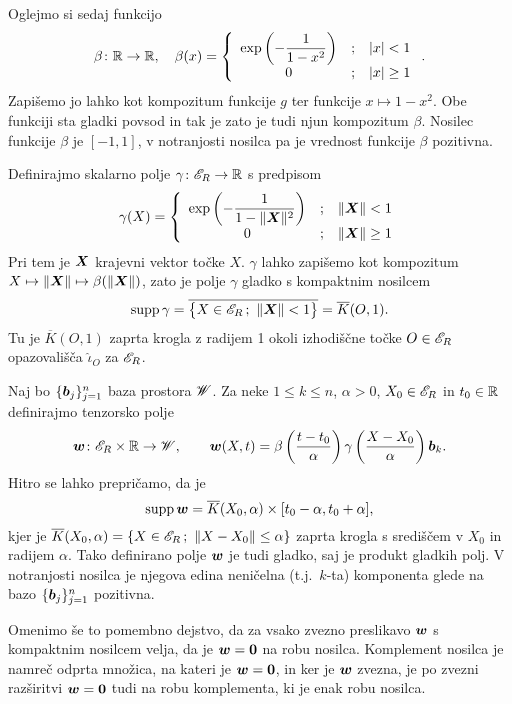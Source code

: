 Oglejmo si sedaj funkcijo
\[
	\beta\colon\mathbb R\to\mathbb R,\quad \beta(x)=\left\{\begin{array}{ccl}
	\exp\left(-\dfrac{1}{1-x^2}\right)&;&|x|<1 \\ 0&;&|x|\geq 1 \end{array}\right. .
\]
Zapišemo jo lahko kot kompozitum funkcije $g$ ter funkcije $x\mapsto 1-x^2$. Obe funkciji sta
gladki povsod in tak je zato je tudi njun kompozitum $\beta$. Nosilec funkcije $\beta$ je
$[-1,1]$, v notranjosti nosilca pa je vrednost funkcije $\beta$ pozitivna.

Definirajmo skalarno polje $\gamma\colon\mathscr E_R\to\mathbb R$ s predpisom
\[
	\gamma(X)=\left\{\begin{array}{ccl}
	\exp\left(-\dfrac{1}{1-\|\boldsymbol X\|^2}\right)&;&\|\boldsymbol X\|<1 \\ 0&;&\|\boldsymbol X\|\geq 1 \end{array}\right.
\]
Pri tem je $\boldsymbol X$ krajevni vektor točke $X$. $\gamma$
lahko zapišemo kot kompozitum $X\mapsto\|\boldsymbol X\|\mapsto \beta(\|\boldsymbol X\|)$, zato je polje
$\gamma$ gladko s kompaktnim nosilcem
\[ \textrm{supp}\,\gamma=\overline{\big\{X\in\E_R\,;\ \|\vek{X}\|<1 \big\}}=\overline{K}(O,1). \]
Tu je $\overline{K}(O,1)$ zaprta krogla z radijem 1 okoli izhodiščne točke $O\in\mathscr E_R$
opazovališča $\hat{\iota}_O$ za $\mathscr E_R$.

Naj bo $\{\boldsymbol b_j\}_{j=1}^{n}$ baza prostora $\mathscr W$. Za neke $1\leq k\leq n$, $\alpha>0$,
$X_0\in\mathscr E_R$ in $t_0\in\mathbb R$ definirajmo tenzorsko polje
\begin{equation} \label{e:funiw}
	\boldsymbol w\colon\mathscr E_R\times\mathbb R\to\mathscr W,\qquad\boldsymbol w(X,t)=\beta\left(\frac{t-t_0}{\alpha}\right)
	\gamma\left(\frac{X-X_0}{\alpha}\right)\boldsymbol b_k.
\end{equation}
Hitro se lahko prepričamo, da je
\begin{equation} \label{e:supaw}
	\mathrm{supp}\,\boldsymbol w=\overline{K}(X_0,\alpha)\times[t_0-\alpha,t_0+\alpha],
\end{equation}
kjer je $\overline{K}(X_0,\alpha)=\{X\in\E_R\,;\ \|X-X_0\|\leq\alpha\}$ zaprta krogla
s središčem v $X_0$ in radijem $\alpha$. Tako definirano polje $\boldsymbol w$ je
tudi gladko, saj je produkt gladkih polj. V notranjosti nosilca je njegova 
edina neničelna (t.j.~$k$-ta) komponenta glede na bazo $\{\boldsymbol b_j\}_{j=1}^{n}$ pozitivna.

Omenimo še to pomembno dejstvo, da za vsako zvezno preslikavo $\boldsymbol w$ s kompaktnim
nosilcem velja, da je $\boldsymbol w=\boldsymbol 0$ na robu nosilca. Komplement nosilca je namreč odprta množica, na kateri
je $\boldsymbol w=\boldsymbol 0$, in ker je $\boldsymbol w$ zvezna, je po zvezni razširitvi $\boldsymbol w=\boldsymbol 0$ tudi na robu komplementa,
ki je enak robu nosilca.


